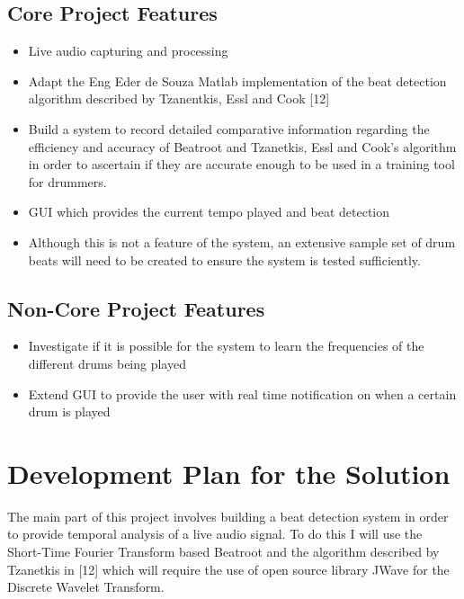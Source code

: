\documentclass[a4paper, 11pt]{article}
\begin{document}
\subsection{Core Project Features}
\begin{itemize}
\item Live audio capturing and processing
\item Adapt the Eng Eder de Souza Matlab implementation of the beat detection algorithm described by Tzanentkis, Essl and Cook [12] 
\item Build a system to record detailed comparative information regarding the efficiency and accuracy of Beatroot and Tzanetkis, Essl and Cook's algorithm in order to ascertain if they are accurate enough to be used in a training tool for drummers.
\item GUI which provides the current tempo played and beat detection
\item Although this is not a feature of the system, an extensive sample set of drum beats will need to be created to ensure the system is tested sufficiently.
\end{itemize}

\subsection{Non-Core Project Features}
\begin{itemize}
\item Investigate if it is possible for the system to learn the frequencies of the different drums being played
\item Extend GUI to provide the user with real time notification on when a certain drum is played
\end{itemize}

\maketitle{} 
\section{Development Plan for the Solution}

The main part of this project involves building a beat detection system in order to provide temporal analysis of a live audio signal. To do this I will use the Short-Time Fourier Transform based Beatroot and the algorithm described by Tzanetkis in [12] which will require the use of open source library JWave for the Discrete Wavelet Transform. 
\end{document}
